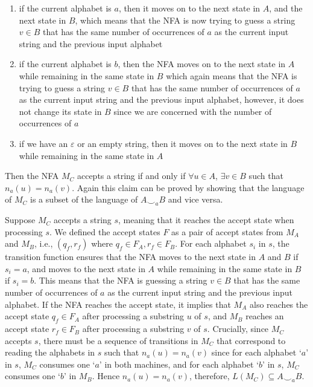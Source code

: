\documentclass[addpoints]{exam}
\begin{document}
\begin{questions}
\begin{solution}
\begin{enumerate}
		\item if the current alphabet is $a$, then it moves on to the next state in $A$, and the next state in $B$, which means that the NFA is now trying to guess a string $v \in B$ that has the same number of occurrences of $a$ as the current input string and the previous input alphabet \vspace*{-2mm}
		\item if the current alphabet is $b$, then the NFA moves on to the next state in $A$ while remaining in the same state in $B$ which again means that the NFA is trying to guess a string $v \in B$ that has the same number of occurrences of $a$ as the current input string and the previous input alphabet, however, it does not change its state in $B$ since we are concerned with the number of occurrences of $a$ \vspace*{-2mm}
		\item if we have an $ \varepsilon $ or an empty string, then it moves on to the next state in $B$ while remaining in the same state in $A$
	\end{enumerate}

	Then the NFA $M_C$ accepts a string if and only if $\forall u \in A $, $ \exists v \in B $ such that $ n_a(u) = n_a(v) $. Again this claim can be proved by showing that the language of $M_C$ is a subset of the language of $ A \smile_a B $ and vice versa.
	
	Suppose $M_C$ accepts a string $s$, meaning that it reaches the accept state when processing $s$. We defined the accept states $F$ as a pair of accept states from $ M_A $ and $ M_B $, i.e., $ (q_f, r_f) $ where $ q_f \in F_A, r_f \in F_B $. For each alphabet $s_i$ in $s$, the transition function ensures that the NFA moves to the next state in $A$ and $B$ if $s_i = a$, and moves to the next state in $A$ while remaining in the same state in $B$ if $s_i = b$. This means that the NFA is guessing a string $v \in B$ that has the same number of occurrences of $a$ as the current input string and the previous input alphabet. If the NFA reaches the accept state, it implies that $M_A$ also reaches the accept state $ q_f \in F_A $ after processing a substring $u$ of $s$, and $M_B$ reaches an accept state $ r_f \in F_B $ after processing a substring $v$ of $s$. Crucially, since $M_C$ accepts $s$, there must be a sequence of transitions in $M_C$ that correspond to reading the alphabets in $s$ such that $ n_a(u) = n_a(v) $ since for each alphabet `$a$' in $s$, $M_C$ consumes one `$a$' in both machines, and for each alphabet `$b$' in $s$, $M_C$ consumes one `$b$' in $M_B$. Hence $ n_a(u) = n_a(v) $, therefore, $L(M_C) \subseteq A \smile_a B$. 
	

\end{solution}
\end{questions}
\end{document}
